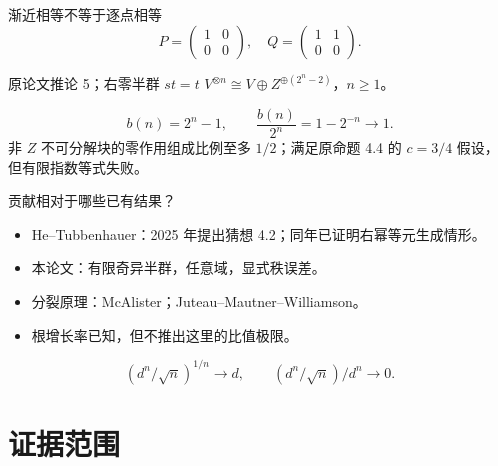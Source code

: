 \documentclass{beamer}
\begin{document}
\begin{frame}{渐近相等不等于逐点相等}
\[
P=\begin{pmatrix}1&0\\0&0\end{pmatrix},\quad Q=\begin{pmatrix}1&1\\0&0\end{pmatrix}.
\]
\begin{block}{原论文推论 5；右零半群 $st=t$}
$V^{\otimes n}\cong V\oplus Z^{\oplus(2^n-2)}$，$n\geq1$。
\end{block}
\[
b(n)=2^n-1,\qquad \frac{b(n)}{2^n}=1-2^{-n}\to1.
\]
非 $Z$ 不可分解块的零作用组成比例至多 $1/2$；满足原命题 4.4 的 $c=3/4$ 假设，但有限指数等式失败。
\end{frame}
\begin{frame}{贡献相对于哪些已有结果？}
\begin{itemize}
\item He--Tubbenhauer：2025 年提出猜想 4.2；同年已证明右幂等元生成情形。
\item 本论文：有限奇异半群，任意域，显式秩误差。
\item 分裂原理：McAlister；Juteau--Mautner--Williamson。
\item 根增长率已知，但不推出这里的比值极限。
\end{itemize}
\[
(d^n/\sqrt n)^{1/n}\to d,\qquad (d^n/\sqrt n)/d^n\to0.
\]
\end{frame}
\section{证据范围}
\end{document}
